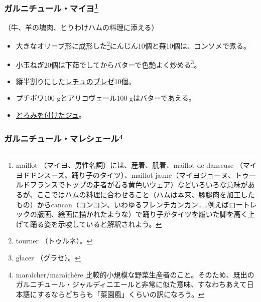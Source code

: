 \begin{recette}
\hypertarget{garniture-a-la-maillot}{%
\subsubsection[ガルニチュール・マイヨ]{\texorpdfstring{ガルニチュール・マイヨ\footnote{maillot
  （マイヨ、男性名詞）には、産着、肌着、maillot de danseuse
  （マイヨドドンスーズ、踊り子のタイツ）、maillot
  jaune（マイヨジョーヌ、トゥールドフランスでトップの走者が着る黄色いウェア）などいろいろな意味があるが、ここではハムの料理に合わせること（ハムは本来、豚腿肉を加工したもの）からcancan（コンコン、いわゆるフレンチカンカン\ldots{}\ldots{}例えばロートレックの版画、絵画に描かれたような）で踊り子がタイツを履いた脚を高く上げて踊る姿を示唆していると解釈されよう。}}{ガルニチュール・マイヨ}}\label{garniture-a-la-maillot}}



（牛、羊の塊肉、とりわけハムの料理に添える）

\begin{itemize}
\item
  大きなオリーブ形に成形した\footnote{tourner （トゥルネ）。}にんじん10個と蕪10個は、コンソメで煮る。
\item
  小玉ねぎ20個は下茹でしてからバターで色艶よく炒める\footnote{glacer
    （グラセ）。}。
\item
  縦半割りにした\protect\hyperlink{laitues-braisees-au-jus}{レチュのブレゼ}10個。
\item
  プチポワ100 gとアリコヴェール100 gはバターであえる。
\item
  \protect\hyperlink{jus-de-veau-lie}{とろみを付けたジュ}。
\end{itemize}

\hypertarget{garniture-a-la-maraichere}{%
\subsubsection[ガルニチュール・マレシェール]{\texorpdfstring{ガルニチュール・マレシェール\footnote{maraîcher/maraîchère
  比較的小規模な野菜生産者のこと。そのため、既出のガルニチュール・ジャルディニエールと非常に似た意味、すなわちあえて日本語にするならどちらも「菜園風」くらいの訳になろう。}}{ガルニチュール・マレシェール}}\label{garniture-a-la-maraichere}}


\end{recette}
